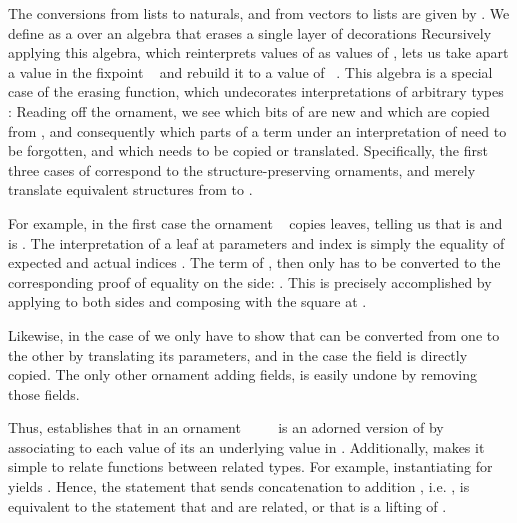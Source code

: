 The conversions from lists to naturals, and from vectors to lists are given by . We define  as a  over an algebra that erases a single layer of decorations
Recursively applying this algebra, which reinterprets values of  as values of , lets us take apart a value in the fixpoint \  and rebuild it to a value of \ . This algebra
is a special case of the erasing function, which undecorates interpretations of arbitrary types :
Reading off the ornament, we see which bits of  are new and which are copied from , and consequently which parts of a term  under an interpretation of  need to be forgotten, and which needs to be copied or translated. Specifically, the first three cases of  correspond to the structure-preserving ornaments, and merely translate equivalent structures from  to .

For example, in the first case the ornament \  copies leaves, telling us that  is  and  is . The interpretation  of a leaf  at parameters  and index  is simply the equality of expected and actual indices . The term  of , then only has to be converted to the corresponding proof of equality on the  side: . This is precisely accomplished by applying  to both sides and composing with the square  at .

Likewise, in the case of  we only have to show that  can be converted from one  to the other  by translating its parameters, and in the  case the field is directly copied. The only other ornament  adding fields, is easily undone by removing those fields. 

Thus,  establishes that  in an ornament \ \ \ \  is an adorned version of  by associating to each value of  its an underlying value in . Additionally,  makes it simple to relate functions between related types. For example, instantiating  for  yields . Hence, the statement that  sends concatenation \AF{\_++\_} to addition \AF{\_+\_}, i.e. , is equivalent to the statement that \AF{\_++\_} and \AF{\_+\_} are related, or that \AF{\_++\_} is a lifting of \AF{\_+\_} \cite{orntrans}. %

